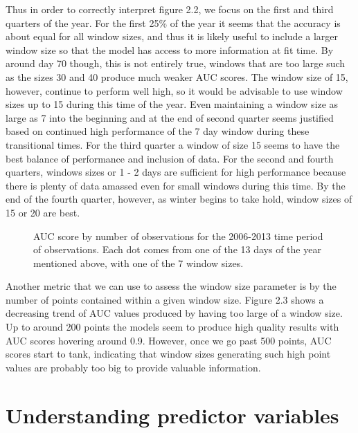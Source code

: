 \noindent Thus in order to correctly interpret figure 2.2, we focus on the first and third quarters of the year. For the first 25\% of the year it seems that the accuracy is about equal for all window sizes, and thus it is likely useful to include a larger window size so that the model has access to more information at fit time. By around day 70 though, this is not entirely true, windows that are too large such as the sizes 30 and 40 produce much weaker AUC scores. The window size of 15, however, continue to perform well high, so it would be advisable to use window sizes up to 15 during this time of the year. Even maintaining a window size as large as 7 into the beginning and at the end of second quarter seems justified based on continued high performance of the 7 day window during these transitional times. For the third quarter a window of size 15 seems to have the best balance of performance and inclusion of data. For the second and fourth quarters, windows sizes or 1 - 2 days are sufficient for high performance because there is plenty of data amassed even for small windows during this time. By the end of the fourth quarter, however, as winter begins to take hold, window sizes of 15 or 20 are best. \newline

\begin{figure} [!ht]
\centerline{}
\caption{AUC score by number of observations for the 2006-2013 time period of observations. Each dot comes from one of the 13 days of the year mentioned above, with one of the 7 window sizes. }
\label{fig6}
\end{figure}

\noindent Another metric that we can use to assess the window size parameter is by the number of points contained within a given window size. Figure 2.3 shows a decreasing trend of AUC values produced by having too large of a window size. Up to around 200 points the models seem to produce high quality results with AUC scores hovering around 0.9. However, once we go past 500 points, AUC scores start to tank, indicating that window sizes generating such high point values are probably too big to provide valuable information.  \newline



\section{Understanding predictor variables}

